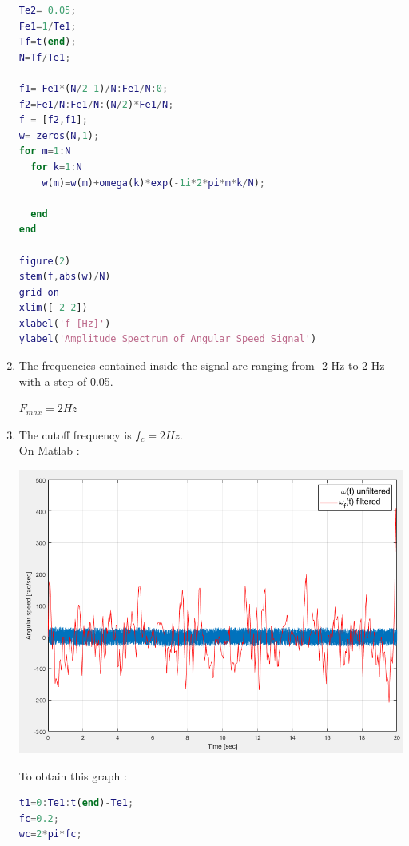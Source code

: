 \documentclass[a4paper,12pt]{article}
\begin{document}
\begin{enumerate}[label={\color{blue}\arabic*)}]
\begin{multicols}{2}
    \begin{lstlisting}[style=Matlab-editor,language=Matlab, basicstyle=\small\ttfamily]
% Plot of the DFT of omega(t)
Te2= 0.05; 
Fe1=1/Te1;
Tf=t(end);
N=Tf/Te1;

f1=-Fe1*(N/2-1)/N:Fe1/N:0;
f2=Fe1/N:Fe1/N:(N/2)*Fe1/N;
f = [f2,f1];
w= zeros(N,1);
for m=1:N
  for k=1:N
    w(m)=w(m)+omega(k)*exp(-1i*2*pi*m*k/N);
  
  end
end

figure(2)
stem(f,abs(w)/N)
grid on
xlim([-2 2])
xlabel('f [Hz]')
ylabel('Amplitude Spectrum of Angular Speed Signal')
        \end{lstlisting}

    \end{multicols}

    \item
    The frequencies contained inside the signal are ranging from -2 Hz to 2 Hz with a step of 0.05.

    \(F_{max} = 2 Hz\)
    \newpage

    \item
    The cutoff frequency is \(f_c = 2 Hz\). \\
    On Matlab :

    \begin{center}
        \includegraphics[scale=0.35]{Images/Omega_Filtered.png}
        \label{Figure3}
    \end{center}

    To obtain this graph :

    \begin{lstlisting}[style=Matlab-editor,language=Matlab, basicstyle=\small\ttfamily]
% filter design
t1=0:Te1:t(end)-Te1;
fc=0.2;
wc=2*pi*fc;


\end{lstlisting}
\end{enumerate}
\end{document}
